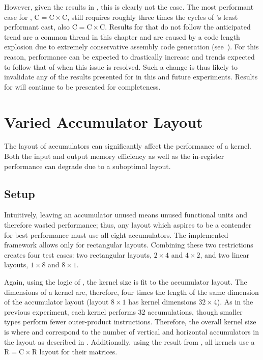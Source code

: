 \documentclass[\main/thesis.tex]{subfiles}
\begin{document}
However, given the results in , this is clearly not the case.
The most performant case for , $\textrm{C} = \textrm{C} \times \textrm{C}$, still requires roughly three times the cycles of 's least performant cast, also $\textrm{C} = \textrm{C} \times \textrm{C}$.
Results for  that do not follow the anticipated trend are a common thread in this chapter and are caused by a code length explosion due to extremely conservative assembly code generation (see~).
For this reason, performance can be expected to drastically increase and trends expected to follow that of  when this issue is resolved.
Such a change is thus likely to invalidate any of the results presented for  in this and future experiments.
Results for  will continue to be presented for completeness.

\section{Varied Accumulator Layout}
The layout of accumulators can significantly affect the performance of a kernel.
Both the input and output memory efficiency as well as the in-register performance can degrade due to a suboptimal layout.

\subsection{Setup}
Intuitively, leaving an accumulator unused means unused functional units and therefore wasted performance; thus, any layout which aspires to be a contender for best performance must use all eight accumulators.
The implemented framework allows only for rectangular layouts.
Combining these two restrictions creates four test cases: two rectangular layouts, $2 \times 4$ and $4 \times 2$, and two linear layouts, $1 \times 8$ and $8 \times 1$.

Again, using the logic of , the kernel size is fit to the accumulator layout.
The dimensions of a kernel are, therefore, four times the length of the same dimension of the accumulator layout (\eg layout $8 \times 1$ has kernel dimensions $32 \times 4$).
As in the previous experiment, each kernel performs 32 accumulations, though smaller types perform fewer outer-product instructions.
Therefore, the overall kernel size is  where  and  correspond to the number of vertical and horizontal accumulators in the layout as described in .
Additionally, using the result from , all kernels use a $\textrm{R} = \textrm{C} \times \textrm{R}$ layout for their matrices.
\end{document}
